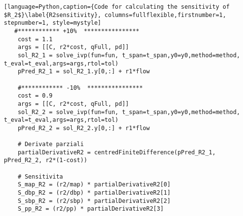 \begin{lstlisting}[language=Python,caption={Code for calculating the sensitivity of $R_2$}\label{R2sensitivity}, columns=fullflexible,firstnumber=1, stepnumber=1, style=mystyle]
   #************ +10%  ****************
    cost = 1.1
    args = [[C, r2*cost, qFull, pd]]
    sol_R2_1 = solve_ivp(fun=fun, t_span=t_span,y0=y0,method=method, t_eval=t_eval,args=args,rtol=tol)
    pPred_R2_1 = sol_R2_1.y[0,:] + r1*flow
    
    #************ -10%  ****************
    cost = 0.9
    args = [[C, r2*cost, qFull, pd]]
    sol_R2_2 = solve_ivp(fun=fun, t_span=t_span,y0=y0,method=method, t_eval=t_eval,args=args,rtol=tol)
    pPred_R2_2 = sol_R2_2.y[0,:] + r1*flow
    
    # Derivate parziali
    partialDerivativeR2 = centredFiniteDifference(pPred_R2_1, pPred_R2_2, r2*(1-cost))
    
    # Sensitivita
    S_map_R2 = (r2/map) * partialDerivativeR2[0]
    S_dbp_R2 = (r2/dbp) * partialDerivativeR2[1]
    S_sbp_R2 = (r2/sbp) * partialDerivativeR2[2]
    S_pp_R2 = (r2/pp) * partialDerivativeR2[3]
\end{lstlisting}